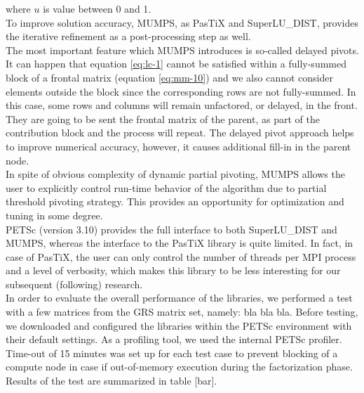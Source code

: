 where $u$ is value between 0 and 1.\\

To improve solution accuracy, MUMPS, as PasTiX and SuperLU\_DIST, provides the iterative refinement as a post-processing step as well.\\


The most important feature which MUMPS introduces is so-called delayed pivots. It can happen that equation \ref{eq:lc-1} cannot be satisfied within a fully-summed block of a frontal matrix (equation  \ref{eq:mm-10}) and we also cannot consider elements outside the block since the corresponding rows are not fully-summed. In this case, some rows and columns will remain unfactored, or delayed, in the front. They are going to be sent the frontal matrix of the parent, as part of the contribution block and the process will repeat. The delayed pivot approach helps to improve numerical accuracy, however, it causes additional fill-in in the parent node.\\


In spite of obvious complexity of dynamic partial pivoting, MUMPS allows the user to explicitly control run-time behavior of the algorithm due to partial threshold pivoting strategy. This provides an opportunity for optimization and tuning in some degree.\\


PETSc (version 3.10) provides the full interface to both SuperLU\_DIST and MUMPS, whereas the interface to the PasTiX library is quite limited. In fact, in case of PasTiX, the user can only control the number of threads per MPI process and a level of verbosity, which makes this library to be less interesting for our subsequent (following) research.\\


In order to evaluate the overall performance of the libraries, we performed a test with a few matrices from the GRS matrix set, namely: bla bla bla. 
Before testing, we downloaded and configured the libraries within the PETSc environment with their default settings. As a profiling tool, we used the internal PETSc profiler. Time-out of 15 minutes was set up for each test case to prevent blocking of a compute node in case if out-of-memory execution during the factorization phase. Results of the test are summarized in table [bar]. \\









